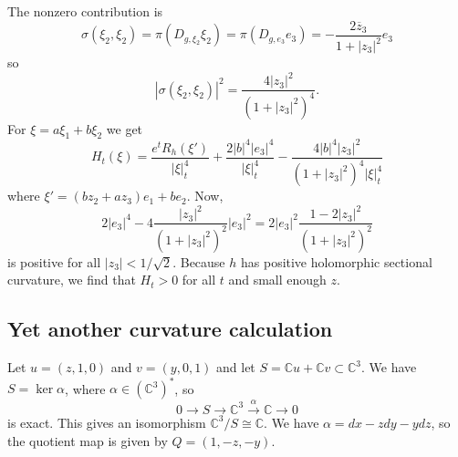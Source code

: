 \documentclass[10pt,a4paper]{amsart}
\newcommand{\kk}[1]{\mathbb{#1}}
\def\ov#1{\overline{#1}}
\def\hsc{holomorphic sectional curvature}
\begin{document}
The nonzero contribution is
$$
\sigma(\xi_2, \xi_2)
= \pi(D_{g,\xi_2} \xi_2)
= \pi(D_{g,e_3} e_3)
= - \frac{2 \ov z_3}{1 + |z_3|^2} e_3
$$
so
$$
|\sigma(\xi_2, \xi_2)|^2
= \frac{4 |z_3|^2}{(1+|z_3|^2)^4}.
$$
For $\xi = a \xi_1 + b \xi_2$ we get
$$
H_t(\xi)
= \frac{e^t R_h(\xi')}{|\xi|_t^4}
+ \frac{2 |b|^4 |e_3|^4}{|\xi|^4_t}
- \frac{4 |b|^4 |z_3|^2}{(1+|z_3|^2)^4|\xi|_t^4}
$$
where $\xi' = (bz_2 + az_3) e_1 + be_2$.
Now,
$$
2|e_3|^4 - 4 \frac{|z_3|^2}{(1+|z_3|^2)^2}|e_3|^2
= 2|e_3|^2
\frac{1 - 2|z_3|^2}{(1+|z_3|^2)^2}
$$
is positive for all $|z_3| < 1/\sqrt 2$.
Because $h$ has positive \hsc{}, we find that $H_t > 0$ for all $t$ and
small enough $z$.



\subsection*{Yet another curvature calculation}

Let $u = (z, 1, 0)$ and $v = (y, 0, 1)$ and let $S = \kk C u + \kk C v \subset
\kk C^3$.
We have $S = \ker \alpha$, where $\alpha \in (\kk C^3)^*$, so
$$
0 \longrightarrow S \longrightarrow \kk C^3
\stackrel{\alpha}{\longrightarrow} \kk C \longrightarrow 0
$$
is exact.
This gives an isomorphism $\kk C^3 / S \cong \kk C$.
We have $\alpha = dx - z dy - y dz$, so the
quotient map is given by $Q = (1, -z, -y)$.
\end{document}
